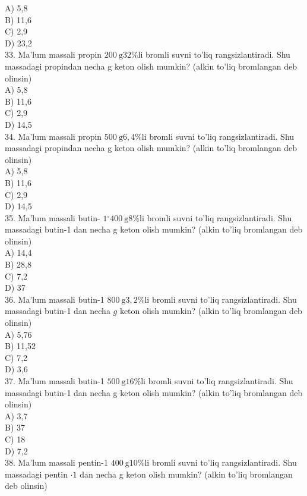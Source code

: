 A) 5,8\\
B) 11,6\\
C) 2,9\\
D) 23,2\\
33. Ma'lum massali propin $200 \mathrm{~g} 32 \% \mathrm{li}$ bromli suvni to'liq rangsizlantiradi. Shu massadagi propindan necha g keton olish mumkin? (alkin to'liq bromlangan deb olinsin)\\
A) 5,8\\
B) 11,6\\
C) 2,9\\
D) 14,5\\
34. Ma'lum massali propin $500 \mathrm{~g} 6,4 \% \mathrm{li}$ bromli suvni to'liq rangsizlantiradi. Shu massadagi propindan necha g keton olish mumkin? (alkin to'liq bromlangan deb olinsin)\\
A) 5,8\\
B) 11,6\\
C) 2,9\\
D) 14,5\\
35. Ma'lum massali butin- $1{ }^{\circ} 400 \mathrm{~g} 8 \% \mathrm{li}$ bromli suvni to'liq rangsizlantiradi. Shu massadagi butin-1 dan necha g keton olish mumkin? (alkin to'liq bromlangan deb olinsin)\\
A) 14,4\\
B) 28,8\\
C) 7,2\\
D) 37\\
36. Ma'lum massali butin-1 $800 \mathrm{~g} 3,2 \% \mathrm{li}$ bromli suvni to'liq rangsizlantiradi. Shu massadagi butin-1 dan necha $g$ keton olish mumkin? (alkin to'liq bromlangan deb olinsin)\\
A) 5,76\\
B) 11,52\\
C) 7,2\\
D) 3,6\\
37. Ma'lum massali butin-1 $500 \mathrm{~g} 16 \% \mathrm{li}$ bromli suvni to'liq rangsizlantiradi. Shu massadagi butin-1 dan necha g keton olish mumkin? (alkin to'liq bromlangan deb olinsin)\\
A) 3,7\\
B) 37\\
C) 18\\
D) 7,2\\
38. Ma'lum massali pentin-1 $400 \mathrm{~g} 10 \% \mathrm{li}$ bromli suvni to'liq rangsizlantiradi. Shu massadagi pentin $\cdot 1$ dan necha g keton olish mumkin? (alkin to'liq bromlangan deb olinsin)\\
